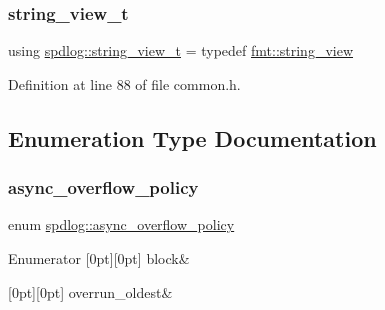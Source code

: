 \subsubsection{\texorpdfstring{string\+\_\+view\+\_\+t}{string\_view\_t}}
{\footnotesize\ttfamily using \hyperlink{namespacespdlog_af48e310b2f366ac6544701e6a3b56247}{spdlog\+::string\+\_\+view\+\_\+t} = typedef \hyperlink{core_8h_a17e3ff7f9ac2b8f068f719b829890036}{fmt\+::string\+\_\+view}}



Definition at line 88 of file common.\+h.



\subsection{Enumeration Type Documentation}
\mbox{\label{namespacespdlog_a42e109759a11c9514d3f6313a7709852}} 
\subsubsection{\texorpdfstring{async\+\_\+overflow\+\_\+policy}{async\_overflow\_policy}}
{\footnotesize\ttfamily enum \hyperlink{namespacespdlog_a42e109759a11c9514d3f6313a7709852}{spdlog\+::async\+\_\+overflow\+\_\+policy}\hspace{0.3cm}{\ttfamily [strong]}}

\begin{DoxyEnumFields}{Enumerator}
[0pt][0pt]{}\mbox{\label{namespacespdlog_a42e109759a11c9514d3f6313a7709852a14511f2f5564650d129ca7cabc333278}} 
block&\\
\hline

[0pt][0pt]{}\mbox{\label{namespacespdlog_a42e109759a11c9514d3f6313a7709852a6d09cc54ae10145444aa2f43fe46d9f2}} 
overrun\+\_\+oldest&\\
\hline

\end{DoxyEnumFields}


